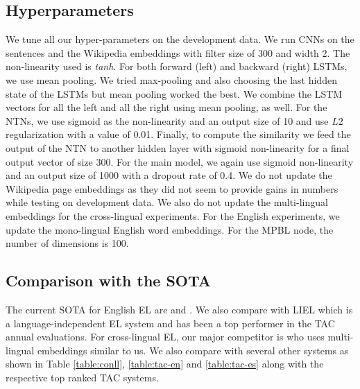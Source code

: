 \documentclass[letterpaper]{article} \usepackage{aaai18}  \usepackage{times}  \usepackage{helvet}  \usepackage{courier}  \usepackage{url}  \usepackage{graphicx}  \frenchspacing  \setlength{\pdfpagewidth}{8.5in}  \setlength{\pdfpageheight}{11in}  \usepackage{latexsym}
\begin{document}
\subsection{Hyperparameters}
We tune all our hyper-parameters on the development data. We run CNNs on the sentences and the Wikipedia embeddings with filter size of 300 and width 2. The non-linearity used is \textit{tanh}. For both forward (left) and backward (right) LSTMs, we use mean pooling. We tried max-pooling and also choosing the last hidden state of the LSTMs but mean pooling worked the best. We combine the LSTM vectors for all the left and all the right using mean pooling, as well. For the NTNs, we use sigmoid as the non-linearity and an output size of 10 and use $L2$ regularization with a value of 0.01. Finally, to compute the similarity we feed the output of the NTN to another hidden layer with sigmoid non-linearity for a final output vector of size 300. For the main model, we again use sigmoid non-linearity and an output size of 1000 with a dropout rate of 0.4. We do not update the Wikipedia page embeddings as they did not seem to provide gains in numbers while testing on development data. We also do not update the multi-lingual embeddings for the cross-lingual experiments. For the English experiments, we update the mono-lingual English word embeddings. For the MPBL node, the number of dimensions is 100.

\subsection{Comparison with the SOTA}
The current SOTA for English EL are \cite{globerson2016collective} and \cite{yamada2016joint}. We also compare with LIEL \cite{sil2016one} which is a language-independent EL system and has been a top performer in the TAC annual evaluations. For cross-lingual EL, our major competitor is \cite{tsai2016cross} who uses multi-lingual embeddings similar to us. We also compare with several other systems as shown in Table \ref{table:conll}, \ref{table:tac-en} and \ref{table:tac-es} along with the respective top ranked TAC systems.
\end{document}
